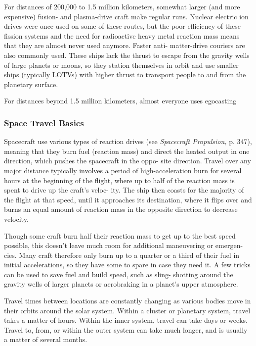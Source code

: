 For distances of 200,000 to 1.5 million kilometers, 
somewhat larger (and more expensive) fusion- and 
plasma-drive craft make regular runs. Nuclear electric 
ion drives were once used on some of these routes, 
but the poor efficiency of these fission systems and the 
need for radioactive heavy metal reaction mass means 
that they are almost never used anymore. Faster anti-
matter-drive couriers are also commonly used. These 
ships lack the thrust to escape from the gravity wells 
of large planets or moons, so they station themselves 
in orbit and use smaller ships (typically LOTVs) with 
higher thrust to transport people to and from the 
planetary surface.

For distances beyond 1.5 million kilometers, almost 
everyone uses egocasting

\subsubsection{Space Travel Basics}

Spacecraft use various types of reaction drives (see 
\textit{Spacecraft Propulsion,} p. 347), meaning that they burn 
fuel (reaction mass) and direct the heated output in 
one direction, which pushes the spacecraft in the oppo-
site direction. Travel over any major distance typically 
involves a period of high-acceleration burn for several 
hours at the beginning of the flight, where up to half of 
the reaction mass is spent to drive up the craft's veloc-
ity. The ship then coasts for the majority of the flight at 
that speed, until it approaches its destination, where it 
flips over and burns an equal amount of reaction mass 
in the opposite direction to decrease velocity.

Though some craft burn half their reaction mass 
to get up to the best speed possible, this doesn't leave 
much room for additional maneuvering or emergen-
cies. Many craft therefore only burn up to a quarter 
or a third of their fuel in initial accelerations, so they 
have some to spare in case they need it. A few tricks 
can be used to save fuel and build speed, such as sling-
shotting around the gravity wells of larger planets or 
aerobraking in a planet's upper atmosphere.

Travel times between locations are constantly 
changing as various bodies move in their orbits 
around the solar system. Within a cluster or planetary 
system, travel takes a matter of hours. Within the 
inner system, travel can take days or weeks. Travel to, 
from, or within the outer system can take much longer, 
and is usually a matter of several months.


